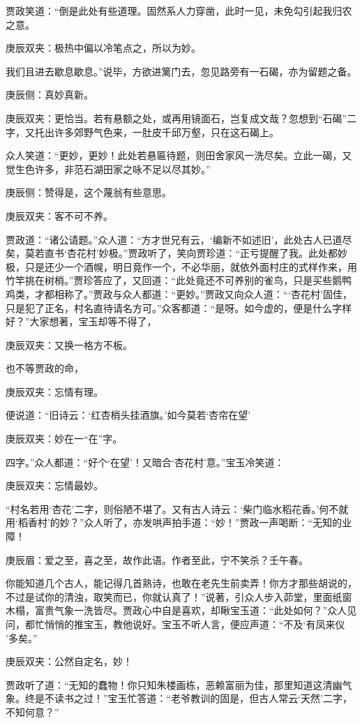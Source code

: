 \begin{parag}
    贾政笑道：“倒是此处有些道理。固然系人力穿凿，此时一见，未免勾引起我归农之意。\begin{note}庚辰双夹：极热中偏以冷笔点之，所以为妙。\end{note}我们且进去歇息歇息。”说毕，方欲进篱门去，忽见路旁有一石碣，亦为留题之备。\begin{note}庚辰侧：真妙真新。\end{note}\begin{note}庚辰双夹：更恰当。若有悬额之处，或再用镜面石，岂复成文哉？忽想到“石碣”二字，又托出许多郊野气色来，一肚皮千邱万壑，只在这石碣上。\end{note}众人笑道：“更妙，更妙！此处若悬匾待题，则田舍家风一洗尽矣。立此一碣，又觉生色许多，非范石湖田家之咏不足以尽其妙。”\begin{note}庚辰侧：赞得是，这个蔑翁有些意思。\end{note}\begin{note}庚辰双夹：客不可不养。\end{note}贾政道：“诸公请题。”众人道：“方才世兄有云，‘编新不如述旧’，此处古人已道尽矣，莫若直书‘杏花村’妙极。”贾政听了，笑向贾珍道：“正亏提醒了我。此处都妙极，只是还少一个酒幌，明日竟作一个，不必华丽，就依外面村庄的式样作来，用竹竿挑在树梢。”贾珍答应了，又回道：“此处竟还不可养别的雀鸟，只是买些鹅鸭鸡类，才都相称了。”贾政与众人都道：“更妙。”贾政又向众人道：“‘杏花村’固佳，只是犯了正名，村名直待请名方可。”众客都道：“是呀。如今虚的，便是什么字样好？”大家想著，宝玉却等不得了，\begin{note}庚辰双夹：又换一格方不板。\end{note}也不等贾政的命，\begin{note}庚辰双夹：忘情有理。\end{note}便说道：“旧诗云：‘红杏梢头挂酒旗。’如今莫若‘杏帘在望’\begin{note}庚辰双夹：妙在一“在”字。\end{note}四字。”众人都道：“好个‘在望’！又暗合‘杏花村’意。”宝玉冷笑道：\begin{note}庚辰双夹：忘情最妙。\end{note}“村名若用‘杏花’二字，则俗陋不堪了。又有古人诗云：‘柴门临水稻花香。’何不就用‘稻香村’的妙？”众人听了，亦发哄声拍手道：“妙！”贾政一声喝断：“无知的业障！\begin{note}庚辰眉：爱之至，喜之至，故作此语。作者至此，宁不笑杀？壬午春。\end{note}你能知道几个古人，能记得几首熟诗，也敢在老先生前卖弄！你方才那些胡说的，不过是试你的清浊，取笑而已，你就认真了！”说著，引众人步入茆堂，里面纸窗木榻，富贵气象一洗皆尽。贾政心中自是喜欢，却瞅宝玉道：“此处如何？”众人见问，都忙悄悄的推宝玉，教他说好。宝玉不听人言，便应声道：“不及‘有凤来仪 ’多矣。”\begin{note}庚辰双夹：公然自定名，妙！\end{note}贾政听了道：“无知的蠢物！你只知朱楼画栋，恶赖富丽为佳，那里知道这清幽气象。终是不读书之过！”宝玉忙答道：“老爷教训的固是，但古人常云‘天然’二字，不知何意？”
\end{parag}


